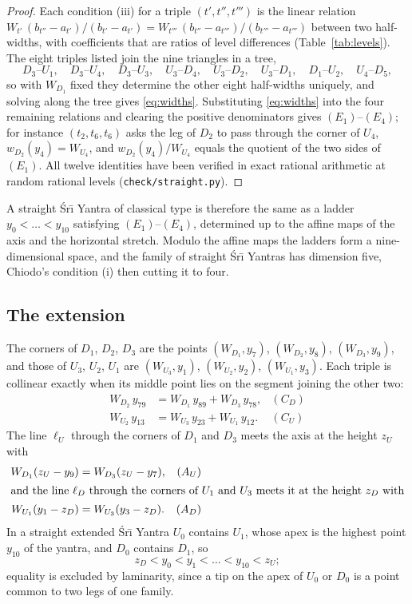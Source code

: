 \documentclass[11pt,a4paper]{article}
\theoremstyle{definition}
\theoremstyle{remark}
\newcommand{\Sri}{\'Sr\={\i}}
\newcommand{\yy}[2]{y_{#1#2}}
\begin{document}
\begin{proof}
Each condition (iii) for a triple $(t',t'',t''')$ is the linear relation
$W_{t'}\,(b_{t''} - a_{t'})/(b_{t'} - a_{t'}) = W_{t'''}\,(b_{t''} - a_{t'''})/(b_{t'''} - a_{t'''})$
between two half-widths, with coefficients that are ratios of level differences (Table~\ref{tab:levels}).
The eight triples listed join the nine triangles in a tree,
\[
D_3\text{--}U_1,\quad D_3\text{--}U_4,\quad D_3\text{--}U_3,\quad U_3\text{--}D_4,\quad
U_3\text{--}D_2,\quad U_3\text{--}D_1,\quad D_1\text{--}U_2,\quad U_4\text{--}D_5,
\]
so with $W_{D_1}$ fixed they determine the other eight half-widths uniquely, and solving along the tree
gives \eqref{eq:widths}. Substituting \eqref{eq:widths} into the four remaining relations and clearing
the positive denominators gives $(E_1)$--$(E_4)$; for instance $(t_2,t_6,t_6)$ asks the leg of $D_2$ to
pass through the corner of $U_4$, $w_{D_2}(y_4) = W_{U_4}$, and $w_{D_2}(y_4)/W_{U_4}$ equals the
quotient of the two sides of $(E_1)$. All twelve identities have been verified in exact rational
arithmetic at random rational levels (\texttt{check/straight.py}).
\end{proof}

A straight \Sri{} Yantra of classical type is therefore the same as a ladder $y_0 < \dots < y_{10}$
satisfying $(E_1)$--$(E_4)$, determined up to the affine maps of the axis and the horizontal stretch.
Modulo the affine maps the ladders form a nine-dimensional space, and the family of straight
\Sri{} Yantras has dimension five, Chiodo's condition (i) then cutting it to four.

\subsection{The extension}
The corners of $D_1$, $D_2$, $D_3$ are the points $(W_{D_1}, y_7)$, $(W_{D_2}, y_8)$, $(W_{D_3}, y_9)$, and
those of $U_3$, $U_2$, $U_1$ are $(W_{U_3}, y_1)$, $(W_{U_2}, y_2)$, $(W_{U_1}, y_3)$. Each triple is
collinear exactly when its middle point lies on the segment joining the other two:
\begin{align}
W_{D_2}\,\yy79 &= W_{D_1}\,\yy89 + W_{D_3}\,\yy78, & (C_D)\label{eq:CD}\\
W_{U_2}\,\yy13 &= W_{U_3}\,\yy23 + W_{U_1}\,\yy12. & (C_U)\label{eq:CU}
\end{align}
The line $\ell_U$ through the corners of $D_1$ and $D_3$ meets the axis at the height $z_U$ with
\begin{align}
W_{D_1}(z_U - y_9) &= W_{D_3}(z_U - y_7), & (A_U)\notag\\
\intertext{and the line $\ell_D$ through the corners of $U_1$ and $U_3$ meets it at the height $z_D$ with}
W_{U_1}(y_1 - z_D) &= W_{U_3}(y_3 - z_D). & (A_D)\notag
\end{align} In a straight extended \Sri{} Yantra $U_0$ contains $U_1$, whose apex is the
highest point $y_{10}$ of the yantra, and $D_0$ contains $D_1$, so
\begin{equation}\label{eq:order}
z_D < y_0 < y_1 < \dots < y_{10} < z_U ;
\end{equation}
equality is excluded by laminarity, since a tip on the apex of $U_0$ or $D_0$ is a point common to two legs
of one family.
\end{document}
